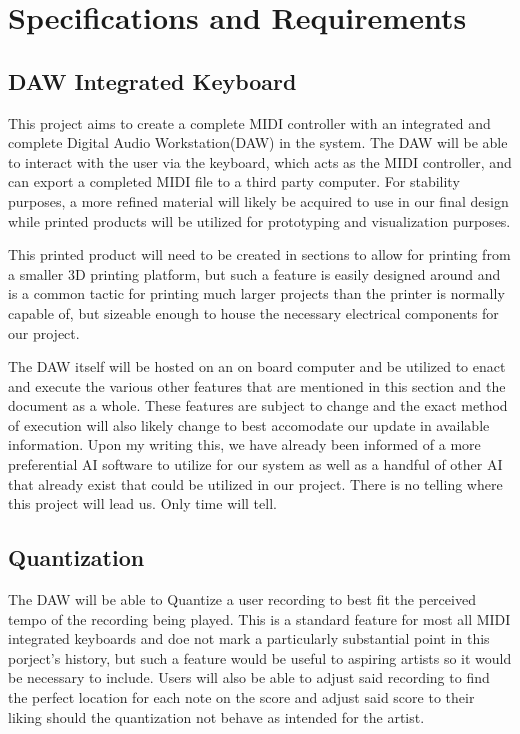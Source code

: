 \section{Specifications and Requirements}

\subsection{DAW Integrated Keyboard}

This project aims to create a complete MIDI controller with an integrated and complete
Digital Audio Workstation(DAW) in the system. The DAW will be able to interact with the
user via the keyboard, which acts as the MIDI controller, and can export a completed MIDI
file to a third party computer. For stability purposes, a more refined material will
likely be acquired to use in our final design while printed products will be utilized for
prototyping and visualization purposes.

This printed product will need to be created in sections to allow for printing from a
smaller 3D printing platform, but such a feature is easily designed around and is a common
tactic for printing much larger projects than the printer is normally capable of, but
sizeable enough to house the necessary electrical components for our project. 

The DAW itself will be hosted on an on board computer and be utilized to enact and execute
the various other features that are mentioned in this section and the document as a whole.
These features are subject to change and the exact method of execution will also likely
change to best accomodate our update in available information. Upon my writing this, we
have already been informed of a more preferential AI software to utilize for our system as
well as a handful of other AI that already exist that could be utilized in our project.
There is no telling where this project will lead us. Only time will tell.

\subsection{Quantization}

The DAW will be able to Quantize a user recording to best fit the perceived tempo of the
recording being played. This is a standard feature for most all MIDI integrated keyboards
and doe not mark a particularly substantial point in this porject's history, but such a
feature would be useful to aspiring artists so it would be necessary to include. Users
will also be able to adjust said recording to find the perfect location for each note on
the score and adjust said score to their liking should the quantization not behave as
intended for the artist.

